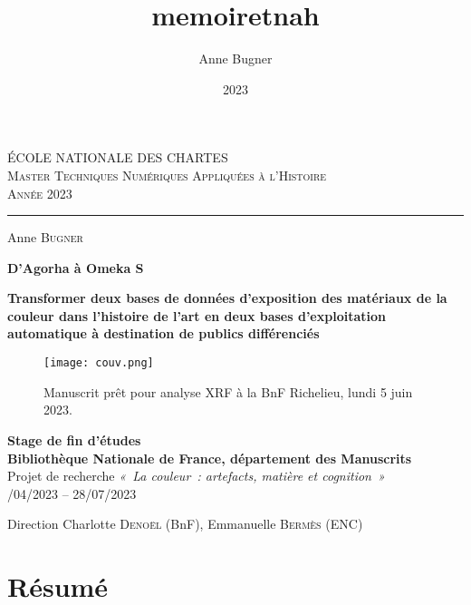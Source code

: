 \documentclass[a4paper,12pt, twoside]{book}
\author{Anne Bugner}
\title{memoiretnah}
\date{2023}
\begin{document}
\begin{titlepage}

\begin{center}

        ÉCOLE NATIONALE DES CHARTES\\
        \textsc{Master Techniques Numériques Appliquées à l'Histoire}\\
        \medskip
        \textsc{Année 2023}  

\begin{center}\rule{2cm}{0.02cm}\end{center}

\bigskip
\bigskip
\bigskip

Anne \textsc{Bugner}

\bigskip
\bigskip
\bigskip
\bigskip
\bigskip

\begin{Large}
\textcolor{greencode}{\textbf{D'Agorha à Omeka S}}\\    
\end{Large}
\bigskip
\bigskip
\begin{large}
    \textcolor{teal1}{\textbf{Transformer deux bases de données d’exposition des matériaux de la couleur dans l’histoire de l’art en deux bases d’exploitation automatique à destination de publics différenciés}}
\end{large}

\begin{figure}[!h]
    \centering
    \texttt{[image: couv.png]}
    \caption*{Manuscrit prêt pour analyse XRF à la BnF Richelieu, lundi 5 juin 2023.}
\end{figure}

\large\textbf{Stage de fin d'études}\\
\medskip
\textbf{Bibliothèque Nationale de France, département des Manuscrits}\\
Projet de recherche \textit{«~La couleur~: artefacts, matière et cognition~»}\\

/04/2023 – 28/07/2023

\vfill

Direction Charlotte \textsc{Denoël} (BnF), Emmanuelle \textsc{Bermès} (ENC)
\end{center}
\end{titlepage}

\frontmatter

\clearemptydoublepage
\chapter*{Résumé}
\end{document}
